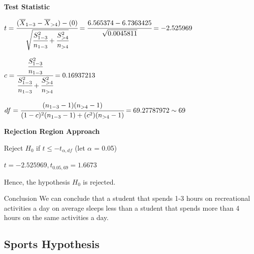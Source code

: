 \documentclass[11pt,]{beamer}
\begin{document}
\begin{frame}

    \textbf{Test Statistic}
    
    \bigskip
    
    $ t = \cfrac{(\overline{X}_{1-3} - \overline{X}_{>4}) - (0)}{\sqrt{\cfrac{S_{1-3}^{2}}{n_{1-3}} + \cfrac{S_{>4}^{2}}{n_{>4}}}} = \cfrac{6.565374 - 6.7363425}{\sqrt{0.0045811}} = -2.525969$
    
    \bigskip
    
    $ c= \cfrac{\cfrac{S_{1-3}^{2}}{n_{1-3}}}{\cfrac{S_{1-3}^{2}}{n_{1-3}} + \cfrac{S_{>4}^{2}}{n_{>4}}} = 0.16937213$
    
    \bigskip
    
    $ df = \cfrac{(n_{1-3} - 1)(n_{>4} - 1)}{(1 - c)^{2}(n_{1-3}- 1) + (c^2)(n_{>4} - 1)} = 69.27787972 \sim 69$
    
\end{frame}

\begin{frame}

    \textbf{Rejection Region Approach}
    
    Reject $H_0$ if $t \leq -t_{\alpha, df}$ (let $\alpha$ = 0.05)
    
    \bigskip
    
    $t = -2.525969, t_{0.05, 69} = 1.6673$ 
    
    \bigskip
    
    Hence, the hypothesis $H_{0}$ is rejected. 
    
    \bigskip
    
    \begin{block}{Conclusion}
    We can conclude that a student that spends 1-3 hours on recreational activities a day on average sleeps less than a student that spends more than 4 hours on the same activities a day. 
    \end{block}
    
\end{frame}


\subsection{Sports Hypothesis}
\end{document}
